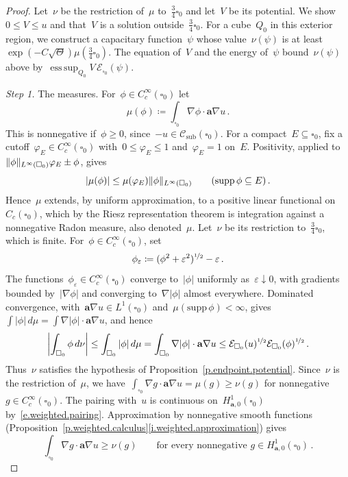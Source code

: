 \documentclass[11pt,letterpaper]{article}
\numberwithin{equation}{section}
\theoremstyle{definition}
\renewcommand{\a}{\mathbf{a}}
\newcommand{\eps}{\varepsilon}
\newcommand{\nf}{\nicefrac}
\newcommand{\cu}{\square}
\newcommand*{\supp}{\mathrm{supp\,}}
\DeclareMathOperator*{\esssup}{ess\,sup}
\DeclarePairedDelimiter{\norm}{\lVert}{\rVert}
\renewcommand{\subset}{\subseteq}
\newcommand{\Ener}{\mathcal E}
\newcommand{\Hzero}[1]{H^1_{#1,0}}
\newcommand{\Csub}{\mathcal C_{\mathrm{sub}}}
\begin{document}
\begin{proof}
Let~$\nu$ be the restriction of~$\mu$ to~$\frac34\cu_0$ and let~$V$ be its potential. We show~$0\leq V\leq u$ and that~$V$ is a solution outside~$\frac34\cu_0$. For a cube~$Q_0$ in this exterior region, we construct a capacitary function~$\psi$ whose value~$\nu(\psi)$ is at least~$\exp(-C\sqrt\Theta)\mu(\frac34\cu_0)$. The equation of~$V$ and the energy of~$\psi$ bound~$\nu(\psi)$ above by~$\esssup_{Q_0}V\,\Ener_{\cu_0}(\psi)$.

\smallskip

\emph{Step 1.} The measures. For~$\phi\in C^\infty_c(\cu_0)$ let
\begin{equation*}
	\mu(\phi)\coloneqq\int_{\cu_0}\nabla\phi\cdot\a\nabla u\,.
\end{equation*}
This is nonnegative if~$\phi\geq0$, since~$-u\in\Csub(\cu_0)$. For a compact~$E\subset\cu_0$, fix a cutoff~$\varphi_E\in C^\infty_c(\cu_0)$ with~$0\leq\varphi_E\leq1$ and~$\varphi_E=1$ on~$E$. Positivity, applied to~$\norm{\phi}_{L^\infty(\cu_0)}\varphi_E\pm\phi$, gives
\begin{equation*}
	|\mu(\phi)|\leq\mu(\varphi_E)\norm{\phi}_{L^\infty(\cu_0)}\qquad(\supp\phi\subseteq E)\,.
\end{equation*}
Hence~$\mu$ extends, by uniform approximation, to a positive linear functional on~$C_c(\cu_0)$, which by the Riesz representation theorem is integration against a nonnegative Radon measure, also denoted~$\mu$. Let~$\nu$ be its restriction to~$\frac34\cu_0$, which is finite. For~$\phi\in C^\infty_c(\cu_0)$, set
\begin{equation*}
	\phi_\eps\coloneqq(\phi^2+\eps^2)^{\nf12}-\eps\,.
\end{equation*}
The functions~$\phi_\eps\in C^\infty_c(\cu_0)$ converge to~$|\phi|$ uniformly as~$\eps\downarrow0$, with gradients bounded by~$|\nabla\phi|$ and converging to~$\nabla|\phi|$ almost everywhere. Dominated convergence, with~$\a\nabla u\in L^1(\cu_0)$ and~$\mu(\supp\phi)<\infty$, gives~$\int|\phi|\,d\mu=\int\nabla|\phi|\cdot\a\nabla u$, and hence
\begin{equation*}
	\biggl|\int_{\cu_0}\phi\,d\nu\biggr|\leq\int_{\cu_0}|\phi|\,d\mu=\int_{\cu_0}\nabla|\phi|\cdot\a\nabla u\leq\Ener_{\cu_0}(u)^{\nf12}\Ener_{\cu_0}(\phi)^{\nf12}\,.
\end{equation*}
Thus~$\nu$ satisfies the hypothesis of Proposition~\ref{p.endpoint.potential}. Since~$\nu$ is the restriction of~$\mu$, we have~$\int_{\cu_0}\nabla g\cdot\a\nabla u=\mu(g)\geq\nu(g)$ for nonnegative~$g\in C^\infty_c(\cu_0)$. The pairing with~$u$ is continuous on~$\Hzero{\a}(\cu_0)$ by~\eqref{e.weighted.pairing}. Approximation by nonnegative smooth functions (Proposition~\ref{p.weighted.calculus}\ref{i.weighted.approximation}) gives
\begin{equation}
	\int_{\cu_0}\nabla g\cdot\a\nabla u\geq\nu(g)\qquad\mbox{for every nonnegative }g\in\Hzero{\a}(\cu_0)\,.
	\label{e.source.restriction}
\end{equation}


\end{proof}
\end{document}
